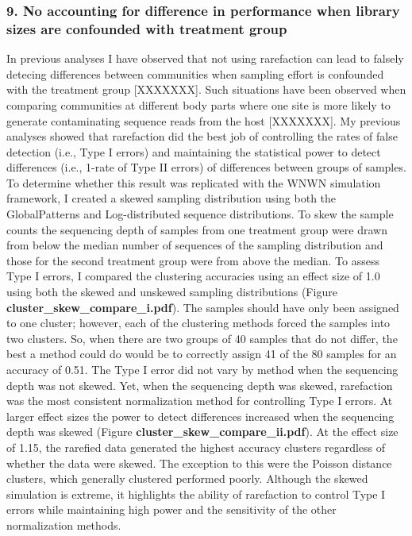 \documentclass[
]{article}
\begin{document}
\hypertarget{no-accounting-for-difference-in-performance-when-library-sizes-are-confounded-with-treatment-group}{%
\subsubsection{9. No accounting for difference in performance when
library sizes are confounded with treatment
group}\label{no-accounting-for-difference-in-performance-when-library-sizes-are-confounded-with-treatment-group}}

In previous analyses I have observed that not using rarefaction can lead
to falsely detecing differences between communities when sampling effort
is confounded with the treatment group {[}XXXXXXX{]}. Such situations
have been observed when comparing communities at different body parts
where one site is more likely to generate contaminating sequence reads
from the host {[}XXXXXXX{]}. My previous analyses showed that
rarefaction did the best job of controlling the rates of false detection
(i.e., Type I errors) and maintaining the statistical power to detect
differences (i.e., 1-rate of Type II errors) of differences between
groups of samples. To determine whether this result was replicated with
the WNWN simulation framework, I created a skewed sampling distribution
using both the GlobalPatterns and Log-distributed sequence
distributions. To skew the sample counts the sequencing depth of samples
from one treatment group were drawn from below the median number of
sequences of the sampling distribution and those for the second
treatment group were from above the median. To assess Type I errors, I
compared the clustering accuracies using an effect size of 1.0 using
both the skewed and unskewed sampling distributions (Figure
\textbf{cluster\_skew\_compare\_i.pdf}). The samples should have only
been assigned to one cluster; however, each of the clustering methods
forced the samples into two clusters. So, when there are two groups of
40 samples that do not differ, the best a method could do would be to
correctly assign 41 of the 80 samples for an accuracy of 0.51. The Type
I error did not vary by method when the sequencing depth was not skewed.
Yet, when the sequencing depth was skewed, rarefaction was the most
consistent normalization method for controlling Type I errors. At larger
effect sizes the power to detect differences increased when the
sequencing depth was skewed (Figure
\textbf{cluster\_skew\_compare\_ii.pdf}). At the effect size of 1.15,
the rarefied data generated the highest accuracy clusters regardless of
whether the data were skewed. The exception to this were the Poisson
distance clusters, which generally clustered performed poorly. Although
the skewed simulation is extreme, it highlights the ability of
rarefaction to control Type I errors while maintaining high power and
the sensitivity of the other normalization methods.
\end{document}
